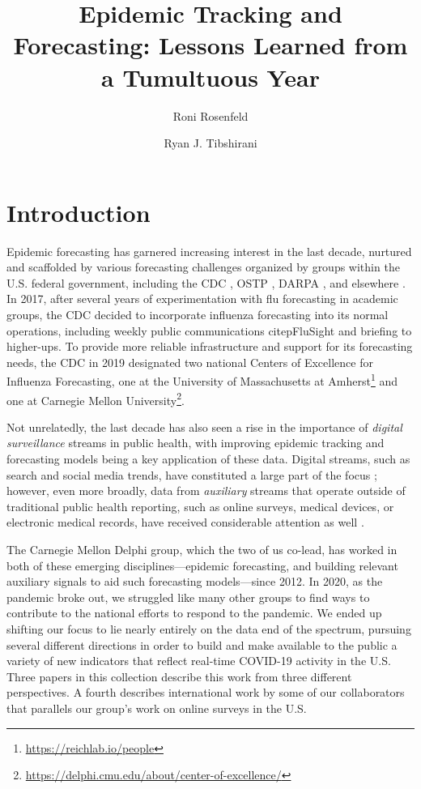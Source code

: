 \documentclass{article}
\title{Epidemic Tracking and Forecasting: Lessons Learned from a Tumultuous Year}
\author{Roni Rosenfeld \and Ryan J. Tibshirani}
\begin{document}
\maketitle

\section{Introduction}

Epidemic forecasting has garnered increasing interest in the last decade,
nurtured and scaffolded by various forecasting challenges organized by groups
within the U.S. federal government, including the CDC \citep{Biggerstaff:2016,
  Biggerstaff:2018, Reich:2019}, OSTP \citep{Johansson:2019}, DARPA
\citep{DelValle:2018}, and elsewhere \citep{Ajelli:2018, Viboud:2018}.  In 2017,
after several years of experimentation with flu forecasting in academic groups,
the CDC decided to incorporate influenza forecasting into its normal operations,
including weekly public communications citep{FluSight} and briefing to
higher-ups.  To provide more reliable infrastructure and support for its
forecasting needs, the CDC in 2019 designated two national Centers of Excellence
for Influenza Forecasting, one at the University of Massachusetts at
Amherst\footnote{\url{https://reichlab.io/people}} and one at Carnegie Mellon
University\footnote{\url{https://delphi.cmu.edu/about/center-of-excellence/}}. 

Not unrelatedly, the last decade has also seen a rise in the importance of
\emph{digital surveillance} streams in public health, with improving epidemic
tracking and forecasting models being a key application of these data.  Digital
streams, such as search and social media trends, have constituted a large part
of the focus \citep{Ginsberg:2009, Brownstein:2009, Salathe:2012,
Kass-Hout:2013, Santillana:2015, Paul:2017}; however, even more broadly, data
from \emph{auxiliary} streams that operate outside of traditional public health
reporting, such as online surveys, medical devices, or electronic medical
records, have received considerable attention as well \citep{Kass-Hout:2011,
Carlson:2013, Viboud:2014, Smolinski:2015, Santillana:2016, Charu:2017,
Koppeschaar:2017, Yang:2019, Leuba:2020, Radin:2020, Ackley:2020}.

The Carnegie Mellon Delphi group, which the two of us co-lead, has worked in
both of these emerging disciplines---epidemic forecasting, and building relevant
auxiliary signals to aid such forecasting models---since 2012.  In 2020, as the
pandemic broke out, we struggled like many other groups to find ways to
contribute to the national efforts to respond to the pandemic.  We ended up
shifting our focus to lie nearly entirely on the data end of the spectrum,
pursuing several different directions in order to build and make available to
the public a variety of new indicators that reflect real-time COVID-19 activity
in the U.S.  Three papers in this collection describe this work from three
different perspectives.  A fourth describes international work by some of our
collaborators that parallels our group's work on online surveys in the U.S.  
\end{document}
